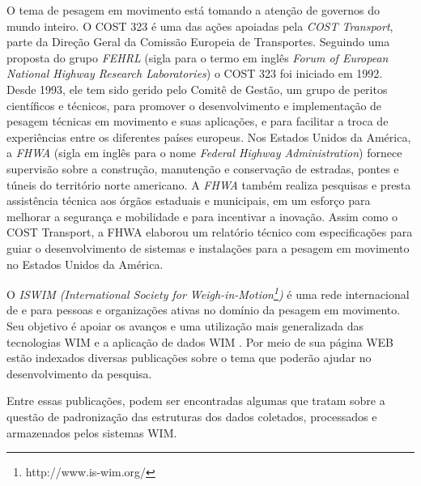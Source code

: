 \documentclass{ufscThesis}
\begin{document}
O tema de pesagem em movimento está tomando a atenção de governos do mundo inteiro. O COST 323 é uma das ações apoiadas pela \textit{COST Transport}, parte da Direção Geral da Comissão Europeia de Transportes. Seguindo uma proposta do grupo \textit{FEHRL} (sigla para o termo em inglês \textit{Forum of European National Highway Research Laboratories}) o COST 323 foi iniciado em 1992. Desde 1993, ele tem sido gerido pelo Comitê de Gestão, um grupo de peritos científicos e técnicos, para promover o desenvolvimento e implementação de pesagem técnicas em movimento e suas aplicações, e para facilitar a troca de experiências entre os diferentes países europeus. Nos Estados Unidos da América, a \textit{FHWA} (sigla em inglês para o nome \textit{Federal Highway Administration}) fornece supervisão sobre a construção, manutenção e conservação de estradas, pontes e túneis do território norte americano. A \textit{FHWA} também realiza pesquisas e presta assistência técnica aos órgãos estaduais e municipais, em um esforço para melhorar a segurança e mobilidade e para incentivar a inovação. Assim como o COST Transport, a FHWA elaborou um relatório técnico \cite{tech:fhwa-wim-data-analysts-manual} com especificações para guiar o desenvolvimento de sistemas e instalações para a pesagem em movimento no Estados Unidos da América.


O \textit{ISWIM (International Society for Weigh-in-Motion\footnote{http://www.is-wim.org/})} é uma rede internacional de e para pessoas e organizações ativas no domínio da pesagem em movimento. Seu objetivo é apoiar os avanços e uma utilização mais generalizada das tecnologias WIM e a aplicação de dados WIM . Por meio de sua página WEB estão indexados diversas publicações sobre o tema que poderão ajudar no desenvolvimento da pesquisa.

Entre essas publicações, podem ser encontradas algumas que tratam sobre a questão de padronização das estruturas dos dados coletados, processados e armazenados pelos sistemas WIM.
\end{document}
